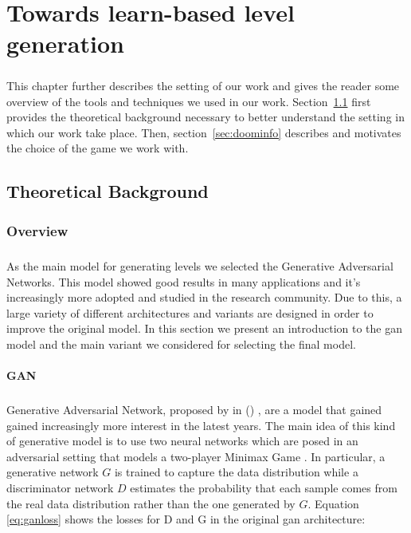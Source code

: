 \chapter{Towards learn-based level generation}
\paragraph{} This chapter further describes the setting of our work and gives the reader some overview of the tools and techniques we used in our work. Section~\ref{sec:gantheory} first provides the theoretical background necessary to better understand the setting in which our work take place. Then, section~\ref{sec:doominfo} describes and motivates the choice of the game we work with. 
\section{Theoretical Background}
\label{sec:gantheory}
\subsection{Overview}
\paragraph{} As the main model for generating levels we selected the Generative Adversarial Networks. This model showed good results in many applications and it's increasingly more adopted and studied in the research community. Due to this, a large variety of different architectures and variants are designed in order to improve the original model. In this section we present an introduction to the \gls{gan} model and the main variant we considered for selecting the final model. 

\subsubsection{GAN}
\label{sec:introgan}
\paragraph{} Generative Adversarial Network, proposed by \citeauthor{gan} in  (\citeyear{gan}) \cite{gan}, are a model that gained gained increasingly more interest in the latest years. The main idea of this kind of generative model is to use two neural networks which are posed in an adversarial setting that models a two-player Minimax Game \cite[p.~276]{minimax}. In particular, a generative network $G$ is trained to capture the data distribution while a discriminator network $D$ estimates the probability that each sample comes from the real data distribution rather than the one generated by $G$. 
Equation \ref{eq:ganloss} shows the losses for D and G in the original \gls{gan} architecture\cite{gan}:

